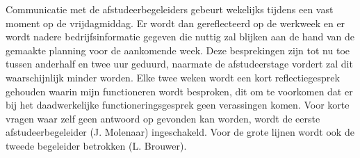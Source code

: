 Communicatie met de afstudeerbegeleiders gebeurt wekelijks tijdens een vast moment op de vrijdagmiddag. Er wordt dan gereflecteerd op de werkweek en er wordt nadere bedrijfsinformatie gegeven die nuttig zal blijken aan de hand van de gemaakte planning voor de aankomende week. Deze besprekingen zijn tot nu toe tussen anderhalf en twee uur geduurd, naarmate de afstudeerstage vordert zal dit waarschijnlijk minder worden. Elke twee weken wordt een kort reflectiegesprek gehouden waarin mijn functioneren wordt besproken, dit om te voorkomen dat er bij het daadwerkelijke functioneringsgesprek geen verassingen komen. Voor korte vragen waar zelf geen antwoord op gevonden kan worden, wordt de eerste afstudeerbegeleider (J. Molenaar) ingeschakeld. Voor de grote lijnen wordt ook de tweede begeleider betrokken (L. Brouwer).